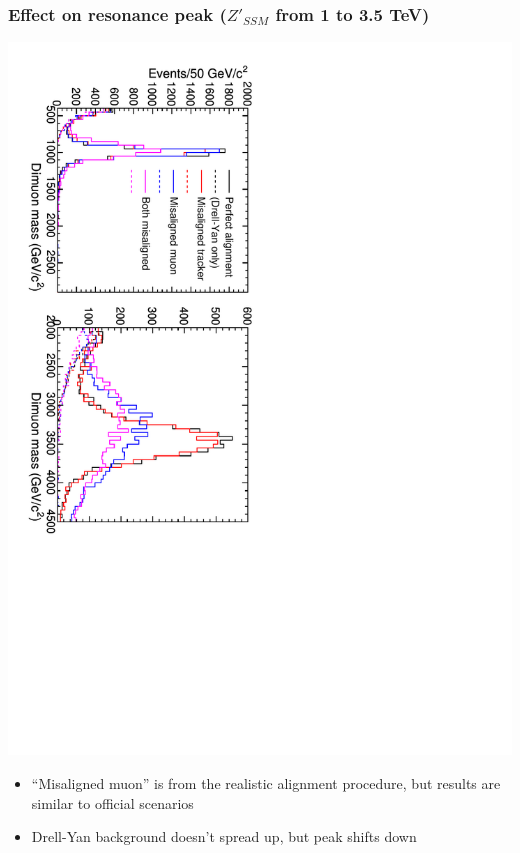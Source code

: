 \documentclass[compress]{beamer}
\begin{document}
\begin{frame}
\frametitle{Effect on resonance peak (${Z'}_{SSM}$ from 1 to 3.5 TeV)}

\includegraphics[height=\linewidth, angle=90]{ZSSM_Align_Spectra_1_35_TeV.pdf}

\begin{itemize}
\item ``Misaligned muon'' is from the realistic alignment procedure, but results are similar to official scenarios
\item Drell-Yan background doesn't spread up, but peak shifts down
\end{itemize}
\end{frame}
\end{document}
